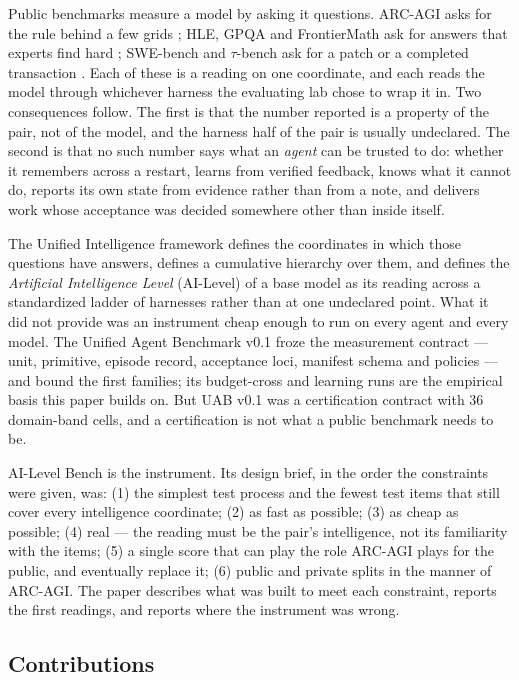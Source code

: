 \documentclass[11pt]{article}
\theoremstyle{definition}
\begin{document}
Public benchmarks measure a model by asking it questions. ARC-AGI asks for the rule behind a few grids \citep{arc2026}; HLE, GPQA and FrontierMath ask for answers that experts find hard \citep{phan2025hle,rein2023gpqa,glazer2024frontiermath}; SWE-bench and $\tau$-bench ask for a patch or a completed transaction \citep{jimenez2023swebench,yao2024taubench}. Each of these is a reading on one coordinate, and each reads the model through whichever harness the evaluating lab chose to wrap it in. Two consequences follow. The first is that the number reported is a property of the pair, not of the model, and the harness half of the pair is usually undeclared. The second is that no such number says what an \emph{agent} can be trusted to do: whether it remembers across a restart, learns from verified feedback, knows what it cannot do, reports its own state from evidence rather than from a note, and delivers work whose acceptance was decided somewhere other than inside itself.

The Unified Intelligence framework \citep{yang2026unified} defines the coordinates in which those questions have answers, defines a cumulative hierarchy over them, and defines the \emph{Artificial Intelligence Level} (AI-Level) of a base model as its reading across a standardized ladder of harnesses rather than at one undeclared point. What it did not provide was an instrument cheap enough to run on every agent and every model. The Unified Agent Benchmark v0.1 \citep{yang2026uab} froze the measurement contract --- unit, primitive, episode record, acceptance loci, manifest schema and policies --- and bound the first families; its budget-cross and learning runs are the empirical basis this paper builds on. But UAB v0.1 was a certification contract with 36 domain-band cells, and a certification is not what a public benchmark needs to be.

AI-Level Bench is the instrument. Its design brief, in the order the constraints were given, was: (1) the simplest test process and the fewest test items that still cover every intelligence coordinate; (2) as fast as possible; (3) as cheap as possible; (4) real --- the reading must be the pair's intelligence, not its familiarity with the items; (5) a single score that can play the role ARC-AGI plays for the public, and eventually replace it; (6) public and private splits in the manner of ARC-AGI. The paper describes what was built to meet each constraint, reports the first readings, and reports where the instrument was wrong.

\subsection{Contributions}
\end{document}
